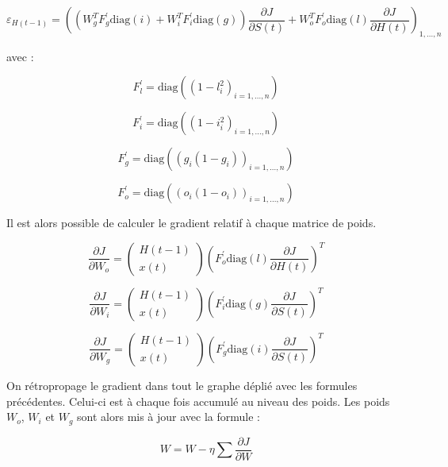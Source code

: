 \documentclass{report}
\theoremstyle{plain}
\theoremstyle{definition}
\theoremstyle{remark}
\begin{document}
\begin{equation}
\varepsilon_{H(t-1)} = \left((W_{g}^{T}F_{g}^{\prime}\text{diag}(i) + W_{i}^{T}F_{i}^{\prime}\text{diag}(g))\frac{\partial J}{\partial S(t)} + W_{o}^{T}F_{o}^{\prime}\text{diag}(l)\frac{\partial J}{\partial H(t)}\right)_{1,...,n}
\end{equation}

avec :

\[
F_{l}^{\prime} = \text{diag}((1 - l_{i}^{2})_{i=1,...,n})
\]

\[
F_{i}^{\prime} = \text{diag}((1 - i_{i}^{2})_{i=1,...,n})
\]

\[
F_{g}^{\prime} = \text{diag}((g_{i}(1 - g_{i}))_{i=1,...,n})
\]

\[
F_{o}^{\prime} = \text{diag}((o_{i}(1 - o_{i}))_{i=1,...,n})
\]


Il est alors possible de calculer le gradient relatif à chaque matrice de poids.

\begin{equation}
\frac{\partial J}{\partial W_{o}}=
\begin{pmatrix}
H(t-1) \\
x(t)
\end{pmatrix}
\left(F_{o}^{\prime}\text{diag}(l)\frac{\partial J}{\partial H(t)}\right)^{T}
\end{equation}

\begin{equation}
\frac{\partial J}{\partial W_{i}}=
\begin{pmatrix}
H(t-1) \\
x(t)
\end{pmatrix}
\left(F_{i}^{\prime}\text{diag}(g)\frac{\partial J}{\partial S(t)}\right)^{T}
\end{equation}

\begin{equation}
\frac{\partial J}{\partial W_{g}}=
\begin{pmatrix}
H(t-1) \\
x(t)
\end{pmatrix}
\left(F_{g}^{\prime}\text{diag}(i)\frac{\partial J}{\partial S(t)}\right)^{T}
\end{equation}

On rétropropage le gradient dans tout le graphe déplié avec les formules précédentes. Celui-ci est à chaque fois accumulé au niveau des poids. Les poids $W_{o}$, $W_{i}$ et $W_{g}$ sont alors mis à jour avec la formule :

\begin{equation}
W = W - \eta \sum{\frac{\partial J}{\partial W}}
\end{equation} 
\end{document}
